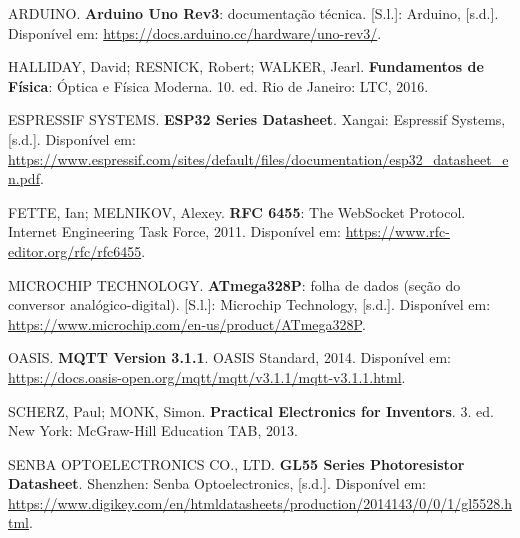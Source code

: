 \documentclass[11pt,a4paper]{article}
\begin{document}
\begin{flushleft}
\small
ARDUINO. \textbf{Arduino Uno Rev3}: documentação técnica. [S.l.]: Arduino, [s.d.]. Disponível em: \url{https://docs.arduino.cc/hardware/uno-rev3/}.

\vspace{6pt}
HALLIDAY, David; RESNICK, Robert; WALKER, Jearl. \textbf{Fundamentos de Física}: Óptica e Física Moderna. 10. ed. Rio de Janeiro: LTC, 2016.

\vspace{6pt}
ESPRESSIF SYSTEMS. \textbf{ESP32 Series Datasheet}. Xangai: Espressif Systems, [s.d.]. Disponível em: \url{https://www.espressif.com/sites/default/files/documentation/esp32_datasheet_en.pdf}.

\vspace{6pt}
FETTE, Ian; MELNIKOV, Alexey. \textbf{RFC 6455}: The WebSocket Protocol. Internet Engineering Task Force, 2011. Disponível em: \url{https://www.rfc-editor.org/rfc/rfc6455}.

\vspace{6pt}
MICROCHIP TECHNOLOGY. \textbf{ATmega328P}: folha de dados (seção do conversor analógico-digital). [S.l.]: Microchip Technology, [s.d.]. Disponível em: \url{https://www.microchip.com/en-us/product/ATmega328P}.

\vspace{6pt}
OASIS. \textbf{MQTT Version 3.1.1}. OASIS Standard, 2014. Disponível em: \url{https://docs.oasis-open.org/mqtt/mqtt/v3.1.1/mqtt-v3.1.1.html}.

\vspace{6pt}
SCHERZ, Paul; MONK, Simon. \textbf{Practical Electronics for Inventors}. 3. ed. New York: McGraw-Hill Education TAB, 2013.

\vspace{6pt}
SENBA OPTOELECTRONICS CO., LTD. \textbf{GL55 Series Photoresistor Datasheet}. Shenzhen: Senba Optoelectronics, [s.d.]. Disponível em: \url{https://www.digikey.com/en/htmldatasheets/production/2014143/0/0/1/gl5528.html}.
\end{flushleft}
\end{document}
